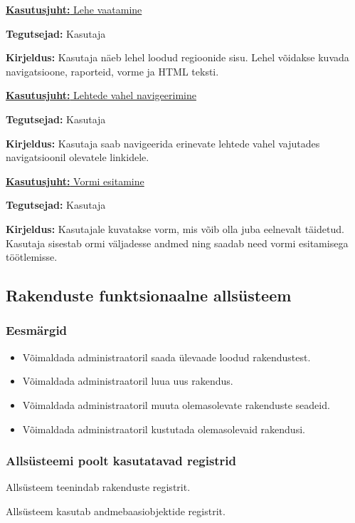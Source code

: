 \documentclass[a4paper,12pt]{article} %
\begin{document}
\underline{\textbf{Kasutusjuht:} Lehe vaatamine}
\par
\textbf{Tegutsejad:} Kasutaja
\par
\textbf{Kirjeldus:} Kasutaja näeb lehel loodud regioonide sisu. Lehel võidakse kuvada navigatsioone, raporteid, vorme ja HTML teksti.
\par

\underline{\textbf{Kasutusjuht:} Lehtede vahel navigeerimine}
\par
\textbf{Tegutsejad:} Kasutaja
\par
\textbf{Kirjeldus:} Kasutaja saab navigeerida erinevate lehtede vahel vajutades navigatsioonil olevatele linkidele.
\par

\underline{\textbf{Kasutusjuht:} Vormi esitamine}
\par
\textbf{Tegutsejad:} Kasutaja
\par
\textbf{Kirjeldus:} Kasutajale kuvatakse vorm, mis võib olla juba eelnevalt täidetud. Kasutaja sisestab ormi väljadesse andmed ning saadab need vormi esitamisega töötlemisse.
\par

\subsection{Rakenduste funktsionaalne allsüsteem}
\subsubsection{Eesmärgid}
\begin{itemize}
\item Võimaldada administraatoril saada ülevaade loodud rakendustest.
\item Võimaldada administraatoril luua uus rakendus.
\item Võimaldada administraatoril muuta olemasolevate rakenduste seadeid.
\item Võimaldada administraatoril kustutada olemasolevaid rakendusi.
\end{itemize}
\subsubsection{Allsüsteemi poolt kasutatavad registrid}
Allsüsteem teenindab rakenduste registrit.\par
Allsüsteem kasutab andmebaasiobjektide registrit.
\end{document}
